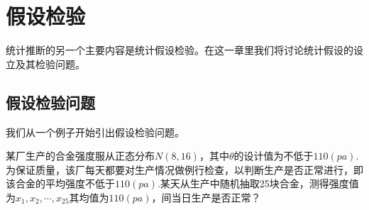 \chapter{假设检验}
统计推断的另一个主要内容是统计假设检验。在这一章里我们将讨论统计假设的设立及其检验问题。

\section{假设检验问题}
我们从一个例子开始引出假设检验问题。
\begin{exam}
某厂生产的合金强度服从正态分布$N(8,16)$，其中$\theta$的设计值为不低于$110(pa)$.为保证质量，该厂每天都要对生产情况做例行检查，以判断生产是否正常进行，即该合金的平均强度不低于$110(pa)$.某天从生产中随机抽取25块合金，测得强度值为$x_{1},x_{2},\cdots,x_{25}$其均值为$110(pa)$，间当日生产是否正常？
\end{exam}